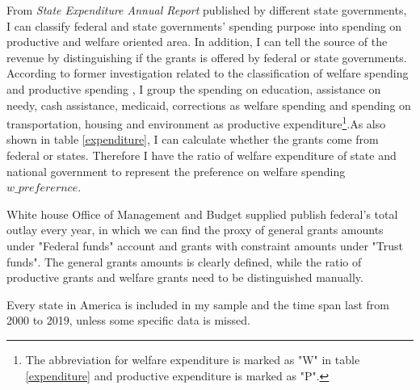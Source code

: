 From \textit{State Expenditure Annual Report} published by different state governments, I can classify federal and state governments' spending purpose into spending on productive and welfare oriented area. In addition, I can tell the source of the revenue by distinguishing if the grants is offered by federal or state governments. According to former investigation related to the classification of welfare spending and productive spending \parencite{AnpingZhao2012welfareexpenditure,lindbeck1988welfare,wlezien2021trends,stichnoth2013ethnic,schneider2005elite}, I group the spending on education, assistance on needy, cash assistance, medicaid, corrections as welfare spending and spending on transportation, housing and environment as productive expenditure\footnote{The abbreviation for welfare expenditure is marked as "W" in table \ref{expenditure} and productive expenditure is marked as "P". }.As also shown in table \ref{expenditure}, I can calculate whether the grants come from federal or states. Therefore I have the ratio of welfare expenditure of state and national government to represent the preference on welfare spending $w\_preferernce$.

White house Office of Management and Budget supplied publish federal's total outlay every year, in which we can find the proxy of general grants amounts  under "Federal funds" account and grants with constraint amounts under "Trust funds". The general grants amounts is clearly defined, while the ratio of productive grants and welfare grants need to be distinguished manually.

Every state in America is included in my sample and the time span last from 2000 to 2019, unless some specific data is missed.


